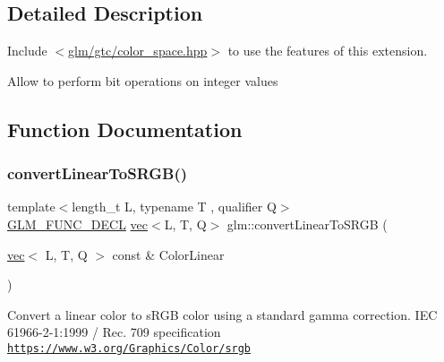 \subsection{Detailed Description}
Include $<$\mbox{\hyperlink{gtc_2color__space_8hpp}{glm/gtc/color\+\_\+space.\+hpp}}$>$ to use the features of this extension.

Allow to perform bit operations on integer values 

\subsection{Function Documentation}
\mbox{\label{group__gtc__color__space_ga42239e7b3da900f7ef37cec7e2476579}} 
\subsubsection{\texorpdfstring{convert\+Linear\+To\+S\+R\+G\+B()}{convertLinearToSRGB()}\hspace{0.1cm}{\footnotesize\ttfamily [1/2]}}
{\footnotesize\ttfamily template$<$length\+\_\+t L, typename T , qualifier Q$>$ \\
\mbox{\hyperlink{setup_8hpp_ab2d052de21a70539923e9bcbf6e83a51}{G\+L\+M\+\_\+\+F\+U\+N\+C\+\_\+\+D\+E\+CL}} \mbox{\hyperlink{structglm_1_1vec}{vec}}$<$L, T, Q$>$ glm\+::convert\+Linear\+To\+S\+R\+GB (\begin{DoxyParamCaption}\item[{\mbox{\hyperlink{structglm_1_1vec}{vec}}$<$ L, T, Q $>$ const \&}]{Color\+Linear }\end{DoxyParamCaption})}

Convert a linear color to s\+R\+GB color using a standard gamma correction. I\+EC 61966-\/2-\/1\+:1999 / Rec. 709 specification \href{https://www.w3.org/Graphics/Color/srgb}{\tt https\+://www.\+w3.\+org/\+Graphics/\+Color/srgb} \mbox{\label{group__gtc__color__space_gaace0a21167d13d26116c283009af57f6}} 
